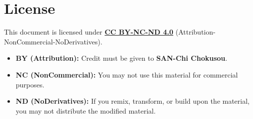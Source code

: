 \documentclass[uplatex,a4paper,11pt,dvipdfmx]{jsarticle}
\begin{document}
\section*{License}

\noindent This document is licensed under \href{http://creativecommons.org/licenses/by-nc-nd/4.0/}{\textbf{CC BY-NC-ND 4.0}} (Attribution-NonCommercial-NoDerivatives).

\begin{itemize}
    \item \textbf{BY (Attribution):} Credit must be given to \textbf{SAN-Chi Chokusou}.
    \item \textbf{NC (NonCommercial):} You may not use this material for commercial purposes.
    \item \textbf{ND (NoDerivatives):} If you remix, transform, or build upon the material, you may not distribute the modified material.
\end{itemize}
\end{document}
